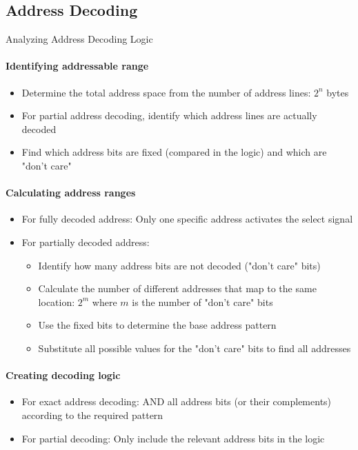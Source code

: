 \subsection{Address Decoding}

\begin{KR}{Analyzing Address Decoding Logic}
\paragraph{Identifying addressable range}
\begin{itemize}
    \item Determine the total address space from the number of address lines: $2^n$ bytes
    \item For partial address decoding, identify which address lines are actually decoded
    \item Find which address bits are fixed (compared in the logic) and which are "don't care"
\end{itemize}

\paragraph{Calculating address ranges}
\begin{itemize}
    \item For fully decoded address: Only one specific address activates the select signal
    \item For partially decoded address:
    \begin{itemize}
        \item Identify how many address bits are not decoded ("don't care" bits)
        \item Calculate the number of different addresses that map to the same location: $2^m$ where $m$ is the number of "don't care" bits
        \item Use the fixed bits to determine the base address pattern
        \item Substitute all possible values for the "don't care" bits to find all addresses
    \end{itemize}
\end{itemize}

\paragraph{Creating decoding logic}
\begin{itemize}
    \item For exact address decoding: AND all address bits (or their complements) according to the required pattern
    \item For partial decoding: Only include the relevant address bits in the logic
\end{itemize}
\end{KR}

